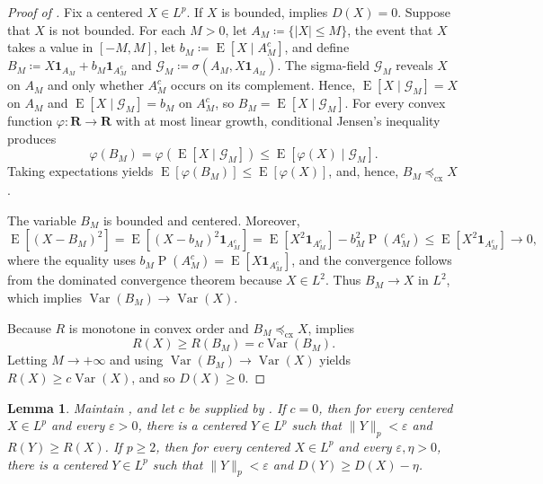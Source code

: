 \documentclass[11pt]{amsart}
\theoremstyle{plain}
\newtheorem{lemma}{Lemma}
\theoremstyle{definition}
\theoremstyle{remark}
\numberwithin{equation}{section}
\newcommand{\1}{\mathbf 1}
\begin{document}
\begin{proof}[Proof of ]
Fix a centered \(X\in L^p\). If \(X\) is bounded,  implies \(D(X)=0\). Suppose that \(X\) is not bounded. For each \(M>0\), let \(A_M\coloneqq\{|X|\leq M\}\), the event that \(X\) takes a value in \([-M,M]\), let \(b_M\coloneqq\operatorname{E}[X\mid A_M^c]\), and define \(B_M\coloneqq X\mathbf 1_{A_M}+b_M\mathbf 1_{A_M^c}\) and \(\mathcal G_M\coloneqq\sigma(A_M,X\mathbf 1_{A_M})\). The sigma-field \(\mathcal G_M\) reveals \(X\) on \(A_M\) and only whether \(A_M^c\) occurs on its complement. Hence, \(\operatorname{E}[X\mid\mathcal G_M]=X\) on \(A_M\) and \(\operatorname{E}[X\mid\mathcal G_M]=b_M\) on \(A_M^c\), so \(B_M=\operatorname{E}[X\mid\mathcal G_M]\). For every convex function \(\varphi\colon\mathbf R\to\mathbf R\) with at most linear growth, conditional Jensen's inequality produces
\[
\varphi(B_M)
=
\varphi\left(\operatorname{E}[X\mid\mathcal G_M]\right)
\leq
\operatorname{E}[\varphi(X)\mid\mathcal G_M].
\]
Taking expectations yields \(\operatorname{E}[\varphi(B_M)]\leq\operatorname{E}[\varphi(X)]\), and, hence, \(B_M\preceq_{\mathrm{cx}}X\).

The variable \(B_M\) is bounded and centered. Moreover,
\[\operatorname{E}\left[\left(X-B_M\right)^2\right] = \operatorname{E}\left[\left(X-b_M\right)^2\mathbf 1_{A_M^c}\right] =
\operatorname{E}\left[X^2\mathbf 1_{A_M^c}\right]
-b_M^2\operatorname{P}(A_M^c) 
\leq \operatorname{E}\left[X^2\mathbf 1_{A_M^c}\right] \rightarrow0,
\]
where the equality uses \(b_M\operatorname{P}(A_M^c)=\operatorname{E}[X\mathbf 1_{A_M^c}]\), and the convergence follows from the dominated convergence theorem because \(X\in L^2\). Thus \(B_M\to X\) in \(L^2\), which implies \(\operatorname{Var}(B_M)\to\operatorname{Var}(X)\). 

Because \(R\) is monotone in convex order and \(B_M\preceq_{\mathrm{cx}}X\),  implies
\[
R(X)\geq R(B_M)=c\operatorname{Var}(B_M).
\]
Letting \(M\to+\infty\) and using
\(\operatorname{Var}(B_M)\to\operatorname{Var}(X)\) yields
\(R(X)\geq c\operatorname{Var}(X)\), and so \(D(X)\geq0\).
\end{proof}

\begin{lemma}\label{lem:tail-compression}
Maintain , and let \(c\) be supplied by . If \(c=0\), then for every centered \(X\in L^p\) and every \(\varepsilon>0\), there is a centered \(Y\in L^p\) such that \(\lVert Y\rVert_p<\varepsilon\) and \(R(Y)\geq R(X)\). If \(p\geq2\), then for every centered \(X\in L^p\) and every \(\varepsilon,\eta>0\), there is a centered \(Y\in L^p\) such that \(\lVert Y\rVert_p<\varepsilon\) and \(D(Y)\geq D(X)-\eta\).
\end{lemma}
\end{document}
